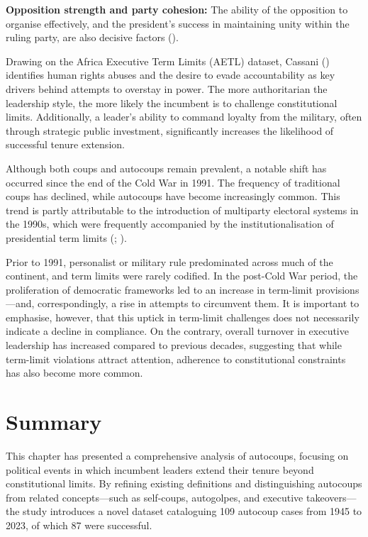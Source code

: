 \documentclass[
  12pt,
]{report}
\begin{document}
\textbf{Opposition strength and party cohesion:} The ability of the
opposition to organise effectively, and the president's success in
maintaining unity within the ruling party, are also decisive factors
().

Drawing on the Africa Executive Term Limits (AETL) dataset, Cassani
() identifies human rights abuses and
the desire to evade accountability as key drivers behind attempts to
overstay in power. The more authoritarian the leadership style, the more
likely the incumbent is to challenge constitutional limits.
Additionally, a leader's ability to command loyalty from the military,
often through strategic public investment, significantly increases the
likelihood of successful tenure extension.

Although both coups and autocoups remain prevalent, a notable shift has
occurred since the end of the Cold War in 1991. The frequency of
traditional coups has declined, while autocoups have become increasingly
common. This trend is partly attributable to the introduction of
multiparty electoral systems in the 1990s, which were frequently
accompanied by the institutionalisation of presidential term limits
(;
).

Prior to 1991, personalist or military rule predominated across much of
the continent, and term limits were rarely codified. In the post-Cold
War period, the proliferation of democratic frameworks led to an
increase in term-limit provisions---and, correspondingly, a rise in
attempts to circumvent them. It is important to emphasise, however, that
this uptick in term-limit challenges does not necessarily indicate a
decline in compliance. On the contrary, overall turnover in executive
leadership has increased compared to previous decades, suggesting that
while term-limit violations attract attention, adherence to
constitutional constraints has also become more common.

\section{Summary}\label{summary}

This chapter has presented a comprehensive analysis of autocoups,
focusing on political events in which incumbent leaders extend their
tenure beyond constitutional limits. By refining existing definitions
and distinguishing autocoups from related concepts---such as self-coups,
autogolpes, and executive takeovers---the study introduces a novel
dataset cataloguing 109 autocoup cases from 1945 to 2023, of which 87
were successful.
\end{document}
